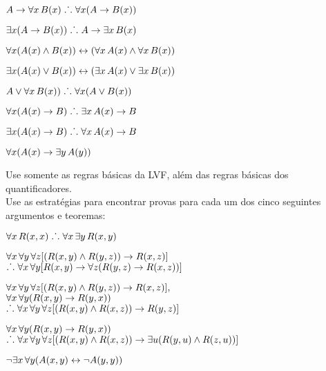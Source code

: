 \begin{earg}
\item $A \rightarrow \forall x\,\mathord{B}(x) \mathrel{\ldotp\dot{}\,\ldotp} \forall x(A \rightarrow \mathord{B}(x))$
\item $\exists x(A \rightarrow \mathord{B}(x)) \mathrel{\ldotp\dot{}\,\ldotp} A \rightarrow \exists x\, \mathord{B}(x)$
\item $\forall x(\mathord{A}(x) \wedge \mathord{B}(x)) \leftrightarrow (\forall x\,\mathord{A}(x) \wedge \forall x\,\mathord{B}(x))$
\item $\exists x(\mathord{A}(x) \vee \mathord{B}(x)) \leftrightarrow (\exists x\,\mathord{A}(x) \vee \exists x\,\mathord{B}(x))$
\item $A \vee \forall x\,\mathord{B}(x)) \mathrel{\ldotp\dot{}\,\ldotp} \forall x(A \vee \mathord{B}(x))$
\item $\forall x(\mathord{A}(x) \rightarrow B) \mathrel{\ldotp\dot{}\,\ldotp} \exists x\,\mathord{A}(x) \rightarrow B$
\item $\exists x(\mathord{A}(x) \rightarrow B) \mathrel{\ldotp\dot{}\,\ldotp} \forall x\,\mathord{A}(x) \rightarrow B$
\item $\forall x(\mathord{A}(x) \rightarrow \exists y\,\mathord{A}(y))$
\end{earg}
Use somente as regras básicas da LVF, além das regras básicas dos quantificadores.\\

\problempart
Use as estratégias para encontrar provas para cada um dos cinco seguintes argumentos e teoremas:
\begin{earg}
\item $\forall x\,\mathord{R}(x,x) \mathrel{\ldotp\dot{}\,\ldotp} \forall x\,\exists y\,\mathord{R}(x,y)$
\item $\forall x\,\forall y\,\forall z[(\mathord{R}(x,y) \wedge \mathord{R}(y,z)) \rightarrow \mathord{R}(x,z)]$ \\
$\mathrel{\ldotp\dot{}\,\ldotp} \forall x\,\forall y[\mathord{R}(x,y) \rightarrow \forall z(\mathord{R}(y,z) \rightarrow \mathord{R}(x,z))]$
\item $\forall x\,\forall y\,\forall z[(\mathord{R}(x,y) \wedge \mathord{R}(y,z)) \rightarrow \mathord{R}(x,z)],$\\ $\forall x\,\forall y(\mathord{R}(x,y) \rightarrow \mathord{R}(y, x))$ \\ $\mathrel{\ldotp\dot{}\,\ldotp} \forall x\,\forall y\,\forall z[(\mathord{R}(x,y) \wedge \mathord{R}(x,z)) \rightarrow \mathord{R}(y,z)]$
\item $\forall x\,\forall y(\mathord{R}(x,y) \rightarrow \mathord{R}(y, x))$ \\$\mathrel{\ldotp\dot{}\,\ldotp} \forall x\,\forall y\,\forall z[(\mathord{R}(x,y) \wedge \mathord{R}(x,z)) \rightarrow \exists u(\mathord{R}(y,u) \wedge \mathord{R}(z,u))]$
\item $\neg \exists x\,\forall y (\mathord{A}(x, y) \leftrightarrow \lnot\mathord{A}(y, y))$
\end{earg}

